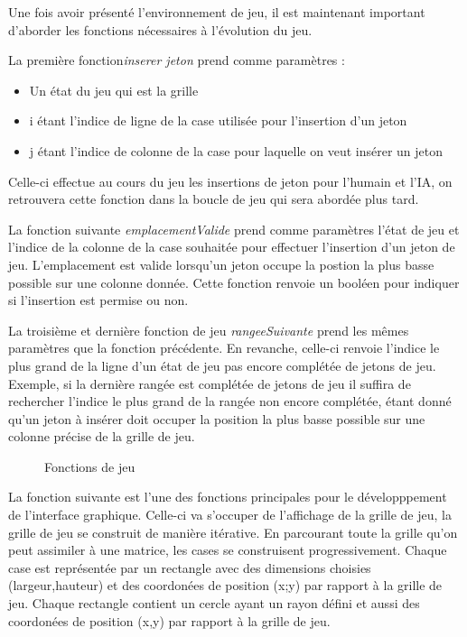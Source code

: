 \documentclass[a4paper]{article}
\begin{document}
Une fois avoir présenté l'environnement de jeu, il est maintenant important d'aborder les fonctions nécessaires à l'évolution du jeu.

La première fonction\textit{inserer jeton} prend comme paramètres :
 
 \begin{itemize}
 \item Un état du jeu qui est la grille
 \item i étant l'indice de ligne de la case utilisée pour l'insertion d'un jeton
 \item j étant l'indice de colonne de la case pour laquelle on veut insérer un jeton
 \end{itemize}

Celle-ci effectue au cours du jeu les insertions de jeton pour l'humain et l'IA, on retrouvera cette fonction dans la boucle de jeu qui sera abordée plus tard.

La fonction suivante \textit{emplacementValide} prend comme paramètres l'état de jeu et l'indice de la colonne de la case souhaitée pour effectuer l'insertion d'un jeton de jeu.
L'emplacement est valide lorsqu'un jeton occupe la postion la plus basse possible sur une colonne donnée. Cette fonction renvoie un booléen pour indiquer si l'insertion est permise ou non.

\newpage

La troisième et dernière fonction de jeu \textit{rangeeSuivante} prend les mêmes paramètres que la fonction précédente. En revanche, celle-ci renvoie l'indice le plus grand de la ligne d'un état de jeu pas encore complétée de jetons de jeu.
Exemple, si la dernière rangée est complétée de jetons de jeu il suffira de rechercher l'indice le plus grand de la rangée non encore complétée, étant donné qu'un jeton à insérer doit occuper la position la plus basse possible sur une colonne précise de la grille de jeu.


\begin{figure}[h!]
      \centering 
      \caption{Fonctions de jeu}
 \end{figure}


La fonction suivante est l'une des fonctions principales pour le développpement de l'interface graphique.
Celle-ci va s'occuper de l'affichage de la grille de jeu, la grille de jeu se construit de manière itérative. 
En parcourant toute la grille qu'on peut assimiler à une matrice, les cases se construisent progressivement. Chaque case est représentée par un rectangle avec des dimensions choisies (largeur,hauteur) et des coordonées de position (x;y) par rapport à la grille de jeu. Chaque rectangle contient un cercle ayant un rayon défini et aussi des coordonées de position (x,y) par rapport à la grille de jeu.
\end{document}
